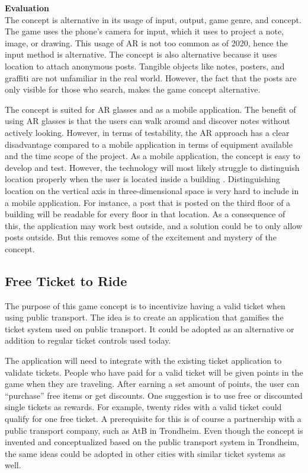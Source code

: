 \documentclass[../Main.tex]{subfiles}
\begin{document}
\textbf{Evaluation} \\
The concept is alternative in its usage of input, output, game genre, and concept. The game uses the phone’s camera for input, which it uses to project a note, image, or drawing. This usage of AR is not too common as of 2020, hence the input method is alternative. The concept is also alternative because it uses location to attach anonymous posts. Tangible objects like notes, posters, and graffiti are not unfamiliar in the real world. However, the fact that the posts are only visible for those who search, makes the game concept alternative.

The concept is suited for AR glasses and as a mobile application. The benefit of using AR glasses is that the users can walk around and discover notes without actively looking. However, in terms of testability, the AR approach has a clear disadvantage compared to a mobile application in terms of equipment available and the time scope of the project. As a mobile application, the concept is easy to develop and test. However, the technology will most likely struggle to distinguish location properly when the user is located inside a building \citep{xia_using_2015}. Distinguishing location on the vertical axis in three-dimensional space is very hard to include in a mobile application. For instance, a post that is posted on the third floor of a building will be readable for every floor in that location. As a consequence of this, the application may work best outside, and a solution could be to only allow posts outside. But this removes some of the excitement and mystery of the concept.

\subsection{Free Ticket to Ride}
The purpose of this game concept is to incentivize having a valid ticket when using public transport. The idea is to create an application that gamifies the ticket system used on public transport. It could be adopted as an alternative or addition to regular ticket controls used today.

The application will need to integrate with the existing ticket application to validate tickets. People who have paid for a valid ticket will be given points in the game when they are traveling. After earning a set amount of points, the user can “purchase” free items or get discounts. One suggestion is to use free or discounted single tickets as rewards. For example, twenty rides with a valid ticket could qualify for one free ticket. A prerequisite for this is of course a partnership with a public transport company, such as AtB in Trondheim. Even though the concept is invented and conceptualized based on the public transport system in Trondheim, the same ideas could be adopted in other cities with similar ticket systems as well.
\end{document}
